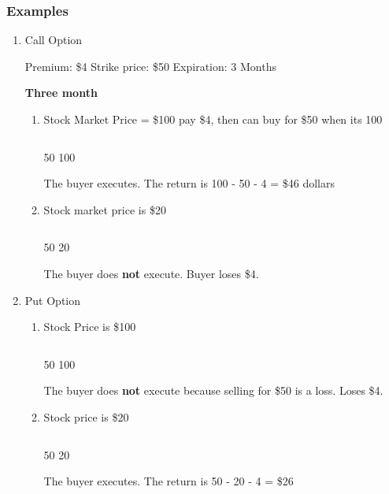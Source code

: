 \documentclass[11pt]{article}
\begin{document}
\subsubsection{Examples}
\label{sec:orgfff5446}
\begin{enumerate}
\item Call Option
\label{sec:org3d4a37d}

Premium: \$4
Strike price: \$50
Expiration: 3 Months

\textbf{Three month}
\begin{enumerate}
\item Stock Market Price = \$100
pay \$4, then can buy for \$50 when its 100

\begin{center}
\begin{tabular}{}
\hline
\end{tabular}
\end{center}
50                                     100

The buyer executes. The return is 100 - 50 - 4 = \$46 dollars

\item Stock market price is \$20

\begin{center}
\begin{tabular}{}
\hline
\end{tabular}
\end{center}
50                                       20

The buyer does \textbf{not} execute. Buyer loses \$4.
\end{enumerate}

\item Put Option
\label{sec:org2840815}

\begin{enumerate}
\item Stock Price is \$100

\begin{center}
\begin{tabular}{}
\hline
\end{tabular}
\end{center}
50                                     100

The buyer does \textbf{not} execute because selling for \$50 is a loss. Loses \$4.

\item Stock price is \$20

\begin{center}
\begin{tabular}{}
\hline
\end{tabular}
\end{center}
50                                     20

The buyer executes. The return is 50 - 20 - 4 = \$26
\end{enumerate}
\end{enumerate}
\end{document}
